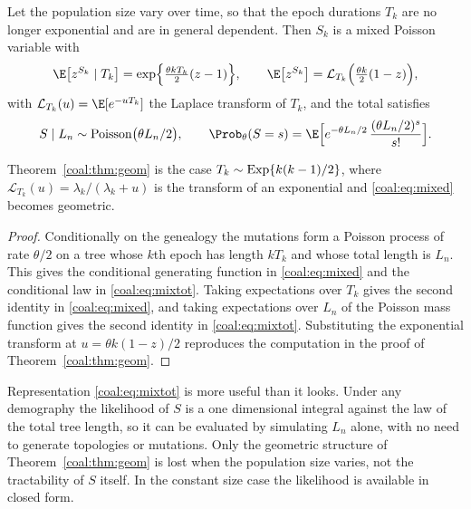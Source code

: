 \begin{proposition}\label{coal:prop:general}
Let the population size vary over time, so that the epoch durations $T_k$ are no longer exponential and are in general dependent. Then $S_k$ is a mixed Poisson variable with
\begin{equation}\label{coal:eq:mixed}
\E\bigl[z^{S_k}\mid T_k\bigr]=\exp\Bigl\{\tfrac{\theta kT_k}{2}(z-1)\Bigr\},\qquad
\E\bigl[z^{S_k}\bigr]=\mathcal{L}_{T_k}\Bigl(\tfrac{\theta k}{2}(1-z)\Bigr),
\end{equation}
with $\mathcal{L}_{T_k}(u)=\E[e^{-uT_k}]$ the Laplace transform of $T_k$, and the total satisfies
\begin{equation}\label{coal:eq:mixtot}
S\mid L_n\sim\coalPois\bigl(\theta L_n/2\bigr),\qquad
\Prob_\theta(S=s)=\E\Bigl[e^{-\theta L_n/2}\,\frac{(\theta L_n/2)^s}{s!}\Bigr].
\end{equation}
\begin{sloppypar}Theorem~\ref{coal:thm:geom} is the case $T_k\sim\mathrm{Exp}\{k(k-1)/2\}$, where $\mathcal{L}_{T_k}(u)=\lambda_k/(\lambda_k+u)$ is the transform of an exponential and \eqref{coal:eq:mixed} becomes geometric.\end{sloppypar}
\end{proposition}

\begin{proof}
Conditionally on the genealogy the mutations form a Poisson process of rate $\theta/2$ on a tree whose $k$th epoch has length $kT_k$ and whose total length is $L_n$. This gives the conditional generating function in \eqref{coal:eq:mixed} and the conditional law in \eqref{coal:eq:mixtot}. Taking expectations over $T_k$ gives the second identity in \eqref{coal:eq:mixed}, and taking expectations over $L_n$ of the Poisson mass function gives the second identity in \eqref{coal:eq:mixtot}. Substituting the exponential transform at $u=\theta k(1-z)/2$ reproduces the computation in the proof of Theorem~\ref{coal:thm:geom}.
\end{proof}

Representation \eqref{coal:eq:mixtot} is more useful than it looks. Under any demography the likelihood of $S$ is a one dimensional integral against the law of the total tree length, so it can be evaluated by simulating $L_n$ alone, with no need to generate topologies or mutations. Only the geometric structure of Theorem~\ref{coal:thm:geom} is lost when the population size varies, not the tractability of $S$ itself. In the constant size case the likelihood is available in closed form.

